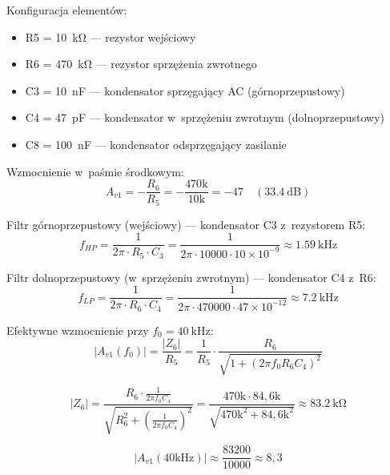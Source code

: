 \documentclass[a4paper,11pt]{article}
\begin{document}
	Konfiguracja elementów:
	\begin{itemize}[nosep]
		\item R5 = \SI{10}{\kilo\ohm} --- rezystor wejściowy
		\item R6 = \SI{470}{\kilo\ohm} --- rezystor sprzężenia zwrotnego
		\item C3 = \SI{10}{\nano\farad} --- kondensator sprzęgający AC (górnoprzepustowy)
		\item C4 = \SI{47}{\pico\farad} --- kondensator w~sprzężeniu zwrotnym (dolnoprzepustowy)
		\item C8 = \SI{100}{\nano\farad} --- kondensator odsprzęgający zasilanie
	\end{itemize}
	
	Wzmocnienie w~paśmie środkowym:
	\begin{equation}
		A_{v1} = -\frac{R_6}{R_5} = -\frac{470\text{k}}{10\text{k}} = -47 \quad (\SI{33,4}{\deci\bel})
		\label{eq:gain1}
	\end{equation}
	
	Filtr górnoprzepustowy (wejściowy) --- kondensator C3 z~rezystorem R5:
	\begin{equation}
		f_{HP} = \frac{1}{2\pi \cdot R_5 \cdot C_3} = \frac{1}{2\pi \cdot 10000 \cdot 10 \times 10^{-9}} \approx \SI{1,59}{\kilo\hertz}
		\label{eq:fhp}
	\end{equation}
	
	Filtr dolnoprzepustowy (w~sprzężeniu zwrotnym) --- kondensator C4 z~R6:
	\begin{equation}
		f_{LP} = \frac{1}{2\pi \cdot R_6 \cdot C_4} = \frac{1}{2\pi \cdot 470000 \cdot 47 \times 10^{-12}} \approx \SI{7,2}{\kilo\hertz}
		\label{eq:flp_raw}
	\end{equation}
	
	Efektywne wzmocnienie przy $f_0 = \SI{40}{\kilo\hertz}$:
	\begin{equation}
		|A_{v1}(f_0)| = \frac{|Z_6|}{R_5} = \frac{1}{R_5} \cdot \frac{R_6}{\sqrt{1 + (2\pi f_0 R_6 C_4)^2}}
		\label{eq:gain1_f0}
	\end{equation}
	
	\begin{equation}
		|Z_6| = \frac{R_6 \cdot \frac{1}{2\pi f_0 C_4}}{\sqrt{R_6^2 + \left(\frac{1}{2\pi f_0 C_4}\right)^2}}
		= \frac{470\text{k} \cdot 84{,}6\text{k}}{\sqrt{470\text{k}^2 + 84{,}6\text{k}^2}} \approx \SI{83,2}{\kilo\ohm}
		\label{eq:z6}
	\end{equation}
	
	\begin{equation}
		|A_{v1}(40\text{kHz})| \approx \frac{83200}{10000} \approx 8{,}3
		\label{eq:gain1_actual}
	\end{equation}
	
\end{document}
